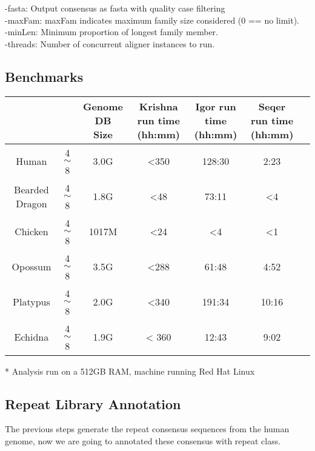 \documentclass[12pt]{report}
\begin{document}
-fasta: Output consensus as fasta with quality case filtering\\
-maxFam: maxFam indicates maximum family size considered (0 == no limit).\\
-minLen: Minimum proportion of longest family member.\\
-threads: Number of concurrent aligner instances to run.


\subsection*{Benchmarks}

\footnotesize  %
\setlength\tabcolsep{1.5pt}
\begin{center}
	\begin{tabular}{|c|c|c|c|c|c|c|}
		\hline
		\thead{Genome}	&	\thead{ Krishna Threads }	&	\thead{Genome DB \\ Size}	& \thead{Krishna run time \\ (hh:mm)}	&	\thead{Igor run time \\ (hh:mm)}	&	\thead{Seqer run time \\ (hh:mm)}  \\
		\hline
		Human	&	4$\sim$8	&	3.0G	&	{<}350	&	128:30	&	2:23 \\
		\hline 
		Bearded Dragon	&	4$\sim$8	&	1.8G	&	{<}48	&	73:11	&	{<}4 \\
		\hline
		Chicken	&	4$\sim$8	&	1017M	&	{<}24	&	{<}4 & {<}1 \\
		\hline
		Opossum	&	4$\sim$8	&	3.5G	&	{<}288	&	61:48	&	4:52 \\
		\hline
		Platypus	&	4$\sim$8	&	2.0G	&	{<}340	&	191:34	&	10:16 \\
		\hline
		Echidna	&	4$\sim$8	&	1.9G	&	{<} 360	&	12:43	&	9:02 \\
		\hline
	\end{tabular}
\end{center}

* Analysis run on a 512GB RAM, machine running Red Hat Linux




\subsection*{Repeat Library Annotation}
The previous steps generate the repeat consensus sequences from the human genome, now we are going to annotated these consensus with repeat class.
\end{document}
